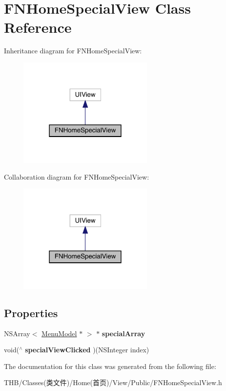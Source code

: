 \hypertarget{interface_f_n_home_special_view}{}\section{F\+N\+Home\+Special\+View Class Reference}
\label{interface_f_n_home_special_view}


Inheritance diagram for F\+N\+Home\+Special\+View\+:\nopagebreak
\begin{figure}[H]
\begin{center}
\leavevmode
\includegraphics[width=190pt]{interface_f_n_home_special_view__inherit__graph}
\end{center}
\end{figure}


Collaboration diagram for F\+N\+Home\+Special\+View\+:\nopagebreak
\begin{figure}[H]
\begin{center}
\leavevmode
\includegraphics[width=190pt]{interface_f_n_home_special_view__coll__graph}
\end{center}
\end{figure}
\subsection*{Properties}
\begin{DoxyCompactItemize}
\item 
\mbox{\label{interface_f_n_home_special_view_ad62ce4826c96a7c59e5f970f67e322af}} 
N\+S\+Array$<$ \mbox{\hyperlink{interface_menu_model}{Menu\+Model}} $\ast$ $>$ $\ast$ {\bfseries special\+Array}
\item 
\mbox{\label{interface_f_n_home_special_view_a29150427118a9027d0f6737dcf4b9a9e}} 
void($^\wedge$ {\bfseries special\+View\+Clicked} )(N\+S\+Integer index)
\end{DoxyCompactItemize}


The documentation for this class was generated from the following file\+:\begin{DoxyCompactItemize}
\item 
T\+H\+B/\+Classes(类文件)/\+Home(首页)/\+View/\+Public/F\+N\+Home\+Special\+View.\+h\end{DoxyCompactItemize}
